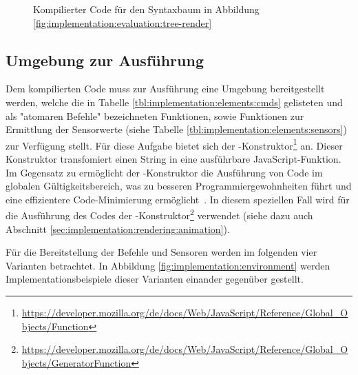 \begin{figure}
  
  \caption{Kompilierter Code für den Syntaxbaum in Abbildung \ref{fig:implementation:evaluation:tree-render}}
  \label{fig:implementation:evaluation:tree-result}
\end{figure}

\subsection[Umgebung zur Ausführung]{Umgebung zur Ausführung\protect\footnotemark}
\label{sec:implementation:evaluation:environment}


Dem kompilierten Code muss zur Ausführung eine Umgebung bereitgestellt werden, welche die in Tabelle \ref{tbl:implementation:elements:cmds} gelisteten und als "atomaren Befehle" bezeichneten Funktionen, sowie Funktionen zur Ermittlung der Sensorwerte (siehe Tabelle \ref{tbl:implementation:elements:sensors}) zur Verfügung stellt. Für diese Aufgabe bietet sich der -Konstruktor\footnote{\url{https://developer.mozilla.org/de/docs/Web/JavaScript/Reference/Global_Objects/Function}} an. Dieser Konstruktor transfomiert einen String in eine ausführbare JavaScript-Funktion. Im Gegensatz zu  ermöglicht der -Konstruktor die Ausführung von Code im globalen Gültigkeitsbereich, was zu besseren Programmiergewohnheiten führt und eine effizientere Code-Minimierung ermöglicht~\cite{mdn-function}. In diesem speziellen Fall wird für die Ausführung des Codes der -Konstruktor\footnote{\url{https://developer.mozilla.org/de/docs/Web/JavaScript/Reference/Global_Objects/GeneratorFunction}} verwendet (siehe dazu auch Abschnitt \ref{sec:implementation:rendering:animation}).

Für die Bereitstellung der Befehle und Sensoren werden im folgenden vier Varianten betrachtet. In Abbildung \ref{fig:implementation:environment} werden Implementationsbeispiele dieser Varianten einander gegenüber gestellt.

